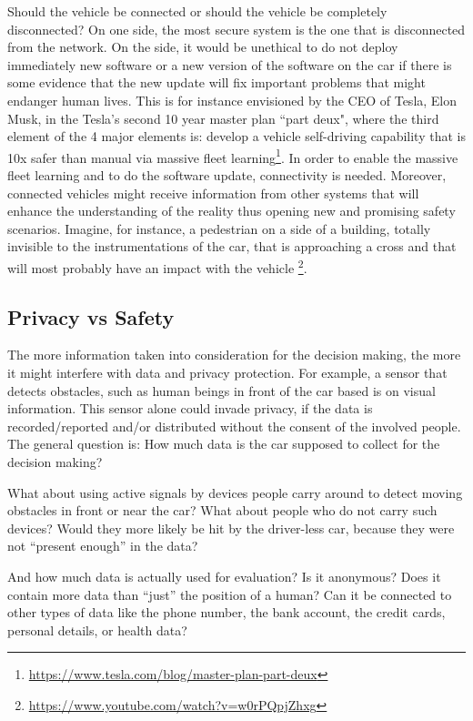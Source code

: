 Should the vehicle be connected or should the vehicle be completely disconnected? On one side, the most secure system is the one that is disconnected from the network. On the side, it would be unethical to do not deploy immediately new software or a new version of the software on the car if there is some evidence that the new update will fix important problems that might endanger human lives. This is for instance envisioned by the CEO of Tesla, Elon Musk, in the Tesla's second 10 year master plan ``part deux", where the third element of the 4 major elements is: develop a vehicle self-driving capability that is 10x safer than manual via massive fleet learning\footnote{\url{https://www.tesla.com/blog/master-plan-part-deux}}.
In order to enable the massive fleet learning and to do the software update, connectivity is needed. Moreover, connected vehicles might receive information from other systems that will enhance the understanding of the reality thus opening new and promising safety scenarios. Imagine, for instance, a pedestrian on a side of a building, totally invisible to the instrumentations of the car, that is approaching a cross and that will most probably have an impact with the vehicle \footnote{\url{https://www.youtube.com/watch?v=w0rPQpjZhxg}}. 


\subsection{Privacy vs Safety}
\label{sec:EAofTC:PrivacyVSSafety}

The more information taken into consideration for the decision making, the more it might interfere with data and privacy protection. For example, a sensor that detects obstacles, such as human beings in front of the car based is on visual information. This sensor alone could invade privacy, if the data is recorded/reported and/or distributed without the consent of the involved people. The general question is: How much data is the car supposed to collect for the decision making?

What about using active signals by devices people carry around to detect moving obstacles in front or near the car? What about people who do not carry such devices? Would they more likely be hit by the driver-less car, because they were not \enquote{present enough} in the data?

And how much data is actually used for evaluation? Is it anonymous? Does it contain more data than \enquote{just} the position of a human? Can it be connected to other types of data like the phone number, the bank account, the credit cards, personal details, or health data?

